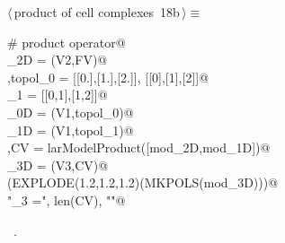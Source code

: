 \documentclass[11pt,oneside]{article}	%
\begin{document}
\begin{flushleft} \small
\begin{minipage}{\linewidth} \label{scrap37}
\protect{}$\langle\,$product of cell complexes\nobreak\ {\footnotesize 18b}$\,\rangle\equiv$
\vspace{-1ex}
\begin{list}{}{} \item
\mbox{}\verb@# product operator@\\
\mbox{}\verb@mod_2D = (V2,FV)@\\
\mbox{},topol_0 = [[0.],[1.],[2.]], [[0],[1],[2]]@\\
\mbox{}\verb@topol_1 = [[0,1],[1,2]]@\\
\mbox{}\verb@mod_0D = (V1,topol_0)@\\
\mbox{}\verb@mod_1D = (V1,topol_1)@\\
\mbox{},CV = larModelProduct([mod_2D,mod_1D])@\\
\mbox{}\verb@mod_3D = (V3,CV)@\\
\mbox{}\verb@VIEW(EXPLODE(1.2,1.2,1.2)(MKPOLS(mod_3D)))@\\
\mbox{}\verb@print "\nk_3 =", len(CV), "\n"@\\
\mbox{}\verb@@{\NWsep}
\end{list}
\vspace{-1ex}
\footnotesize\addtolength{\baselineskip}{-1ex}
\begin{list}{}{\setlength{\itemsep}{-\parsep}\setlength{\itemindent}{-\leftmargin}}
\item \NWtxtMacroRefIn\ .
\end{list}
\end{minipage}\\[4ex]
\end{flushleft}
\end{document}
